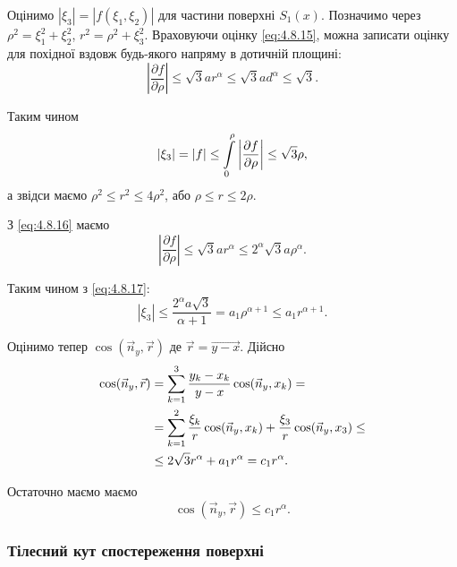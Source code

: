 Оцінимо $|\xi_3| = |f(\xi_1, \xi_2)|$ для частини поверхні $S_1(x)$. Позначимо через $\rho^2 = \xi_1^2 + \xi_2^2$, $r^2 = \rho^2 + \xi_3^2$. Враховуючи оцінку \eqref{eq:4.8.15}, можна записати оцінку для похідної вздовж будь-якого напряму в дотичній площині:
\begin{equation}
	\label{eq:4.8.16}
	\left|\frac{\partial f}{\partial \rho}\right| \le \sqrt{3} a r^{\alpha} \le \sqrt{3} a d^\alpha \le \sqrt{3}.
\end{equation}

Таким чином
\begin{equation}
	\label{eq:4.8.17}
	 |\xi_3| = |f| \le \displaystyle\int\limits_0^\rho \left|\frac{\partial f}{\partial \rho}\right| \le \sqrt{3} \rho,
\end{equation}
а звідси маємо $\rho^2 \le r^2 \le 4 \rho^2$, або $\rho \le r \le 2 \rho$. \medskip

З \eqref{eq:4.8.16} маємо
\begin{equation}
	\left|\frac{\partial f}{\partial \rho}\right| \le \sqrt{3} a r^{\alpha} \le 2^\alpha \sqrt{3} a \rho^\alpha.
\end{equation}

Таким чином з \eqref{eq:4.8.17}:
	\label{eq:4.8.18}
\begin{equation}
	|\xi_3| \le \frac{2^\alpha a \sqrt{3}}{\alpha + 1} = a_1 \rho^{\alpha + 1} \le a_1 r^{\alpha + 1}.
\end{equation}

Оцінимо тепер $\cos(\vec n_y, \vec r)$ де $\vec r = \vec{y - x}$. Дійсно
\begin{equation}
	\begin{aligned}
		\cos(\vec n_y, \vec r) &= \displaystyle\sum\limits_{k = 1}^3 \frac{y_k - x_k}{y - x} \cos(\vec n_y, x_k) = \\
		&= \displaystyle\sum\limits_{k = 1}^2 \frac{\xi_k}{r} \cos(\vec n_y, x_k) + \frac{\xi_3}{r} \cos(\vec n_y, x_3) \le \\
		&\le 2 \sqrt{3} r^\alpha + a_1 r^\alpha = c_1 r^\alpha.
	\end{aligned}
\end{equation}

Остаточно маємо маємо
\begin{equation}
	\label{eq:4.8.19}
	\cos(\vec n_y, \vec r) \le c_1 r^\alpha.
\end{equation}

\subsubsection{Тілесний кут спостереження поверхні}


